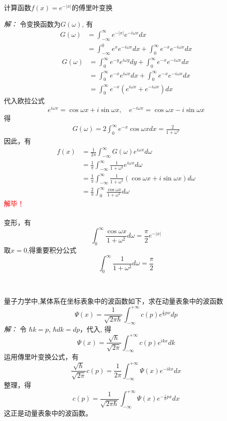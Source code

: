 \begin{example}
计算函数$f(x)=e^{-|x|}$的傅里叶变换 
\end{example}
\emph{解：}
 令变换函数为$ G(\omega) $, 有 \[
	\begin{aligned}
		G(\omega) &= \int_{-\infty}^{\infty} e^{-|x|} e^{-i\omega x} dx \\ 
		&=\int_{-\infty}^{0} e^{x} e^{-i\omega x} dx + \int_{0}^{\infty} e^{-x} e^{-i\omega x} dx 
	\end{aligned}
	\]
	\[
	\begin{aligned}
		G(\omega)
		&=\int_{0}^{\infty} e^{-y} e^{i\omega y} dy + \int_{0}^{\infty} e^{-x} e^{-i\omega x} dx \\
		&= \int_{0}^{\infty} e^{-x} e^{i\omega x} dx + \int_{0}^{\infty} e^{-x} e^{-i\omega x} dx \\
		&= \int_{0}^{\infty} e^{-x} (e^{i\omega x} +e^{-i\omega x} )dx
	\end{aligned}
	\]
	代入欧拉公式
	\[ e^{i\omega x} = \cos \omega x + i \sin \omega x, \quad e^{-i\omega x} = \cos \omega x - i \sin \omega x  \]
	得
	\[
		\begin{aligned}
			G(\omega) 
			= 2 \int_{0}^{\infty} e^{-x} \cos \omega xdx = \frac{2}{1+\omega ^2}
		\end{aligned}
	\]
	因此，有
	\[
	\begin{aligned}
		f(x) &= \frac{1}{2\pi}\int_{-\infty}^{\infty} G(\omega) e^{i\omega x} d\omega \\ 
		&=\frac{1}{\pi}\int_{-\infty}^{\infty} \frac{1}{1+\omega ^2} e^{i\omega x} d\omega  \\
		&=\frac{1}{\pi}\int_{-\infty}^{\infty} \frac{1}{1+\omega ^2} (\cos \omega x + i \sin \omega x) d\omega  \\
		&= \frac{2}{\pi} \int_{0}^{\infty} \frac{\cos \omega x}{1+\omega ^2} d\omega
	\end{aligned}
	\]
	\textcolor{red}{解毕！}\\
	~~\\
	变形，有
	\[ \int_{0}^{\infty} \frac{\cos \omega x}{1+\omega ^2} d\omega = \frac{\pi}{2} e^{-|x|} \]
	取$x=0$,得重要积分公式
	\[ \int_{0}^{\infty} \frac{1}{1+\omega ^2} d\omega = \frac{\pi}{2} \]



~~\\ 
\begin{example} 
	量子力学中,某体系在坐标表象中的波函数如下，求在动量表象中的波函数
$$\Psi(x)=\frac{1}{\sqrt{2\pi \hbar}}  \int_{-\infty}^{+\infty} c(p) e^{\frac{i}{\hbar} px} dp $$
\emph{解：} 
令 $\hbar k =  p$, $\hbar dk =  dp$，代入, 得
$$\Psi(x)=\frac{\sqrt{\hbar} }{\sqrt{2\pi}}  \int_{-\infty}^{+\infty} c(p) e^{i k x} dk $$
运用傳里叶变换公式，有
$$ \frac{\sqrt{\hbar} }{\sqrt{2\pi}} c(p)= \frac{1}{2\pi} \int_{-\infty}^{+\infty}  \Psi(x) e^{-i k x} dx $$
整理，得
$$ c(p)= \dfrac{1}{\sqrt{2\pi \hbar}} \int_{-\infty}^{+\infty} \Psi(x) e^{-\frac{i}{\hbar} p x} d x $$
这正是动量表象中的波函数。

\end{example}

